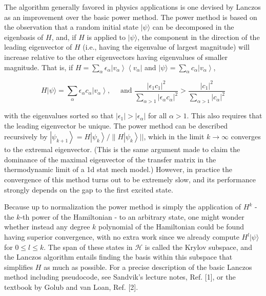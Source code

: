 \documentclass[12pt]{article}
\begin{document}
The algorithm generally favored in physics applications is one devised by Lanczos as an improvement over the basic power method. The power method is based on the observation that a random initial state $|\psi\rangle$ can be decomposed in the eigenbasis of $H$, and, if $H$ is applied to $|\psi\rangle$, the component in the direction of the leading eigenvector of $H$ (i.e., having the eigenvalue of largest magnitude) will increase relative to the other eigenvectors having eigenvalues of smaller magnitude. That is, if $H=\sum_{\alpha} \epsilon_{\alpha}\left|v_{\alpha}\right\rangle\left\langle v_{\alpha}\right|$ and $|\psi\rangle=\sum_{\alpha} c_{\alpha}\left|v_{\alpha}\right\rangle$,


\begin{equation*}
H|\psi\rangle=\sum_{\alpha} \epsilon_{\alpha} c_{\alpha}\left|v_{\alpha}\right\rangle, \quad \text { and } \frac{\left|\epsilon_{1} c_{1}\right|^{2}}{\sum_{\alpha>1}\left|\epsilon_{\alpha} c_{\alpha}\right|^{2}}>\frac{\left|c_{1}\right|^{2}}{\sum_{\alpha>1}\left|c_{\alpha}\right|^{2}} \tag{11}
\end{equation*}


with the eigenvalues sorted so that $\left|\epsilon_{1}\right|>\left|\epsilon_{\alpha}\right|$ for all $\alpha>1$. This also requires that the leading eigenvector be unique. The power method can be described recursively by $\left|\psi_{k+1}\right\rangle=H\left|\psi_{k}\right\rangle / \| H\left|\psi_{k}\right\rangle||$, which in the limit $k \rightarrow \infty$ converges to the extremal eigenvector. (This is the same argument made to claim the dominance of the maximal eigenvector of the transfer matrix in the thermodynamic limit of a 1d stat mech model.) However, in practice the convergence of this method turns out to be extremely slow, and its performance strongly depends on the gap to the first excited state.

Because up to normalization the power method is simply the application of $H^{k}$ - the $k$-th power of the Hamiltonian - to an arbitrary state, one might wonder whether instead any degree $k$ polynomial of the Hamiltonian could be found having superior convergence, with no extra work since we already compute $H^{l}|\psi\rangle$ for $0 \leq l \leq k$. The span of these states in $\mathcal{H}$ is called the Krylov subspace, and the Lanczos algorithm entails finding the basis within this subspace that simplifies $H$ as much as possible. For a precise description of the basic Lanczos method including pseudocode, see Sandvik's lecture notes, Ref. [1], or the textbook by Golub and van Loan, Ref. [2].
\end{document}
